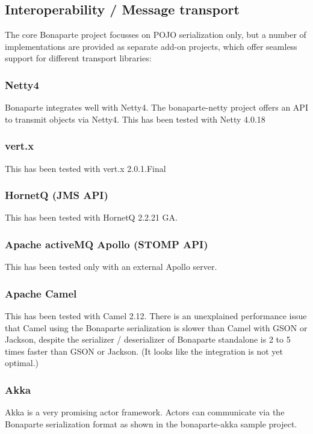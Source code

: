 \documentclass[11pt,a4paper,oneside]{article}
\begin{document}
\subsection{Interoperability / Message transport}
The core Bonaparte project focusses on POJO serialization only, but a number of implementations are provided as separate add-on projects, which offer seamless support for different transport libraries:

\subsubsection{Netty4}
Bonaparte integrates well with Netty4.
The bonaparte-netty project offers an API to transmit objects via Netty4.
This has been tested with Netty 4.0.18

\subsubsection{vert.x}
This has been tested with vert.x 2.0.1.Final

\subsubsection{HornetQ (JMS API)}
This has been tested with HornetQ 2.2.21 GA.

\subsubsection{Apache activeMQ Apollo (STOMP API)}
This has been tested only with an external Apollo server.

\subsubsection{Apache Camel}
This has been tested with Camel 2.12. There is an unexplained performance issue that Camel using the Bonaparte serialization is slower than Camel with GSON or Jackson,
 despite the serializer / deserializer of Bonaparte standalone is 2 to 5 times faster than GSON or Jackson. (It looks like the integration is not yet optimal.)

\subsubsection{Akka}
Akka is a very promising actor framework. Actors can communicate via the Bonaparte serialization format as shown in the bonaparte-akka sample project.
\end{document}
